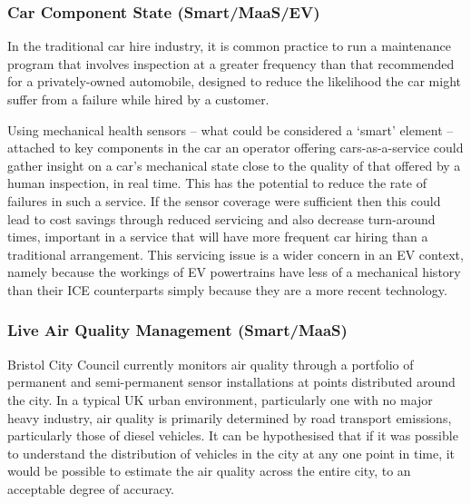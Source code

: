 \documentclass[b5paper,10pt]{article}
\begin{document}
\subsubsection{Car Component State (Smart/MaaS/EV)}

In the traditional car hire industry, it is common practice to run a
maintenance program that involves inspection at a greater frequency
than that recommended for a privately-owned automobile, designed to
reduce the likelihood the car might suffer from a failure while hired
by a customer.

Using mechanical health sensors -- what could be considered a `smart'
element -- attached to key components in the car an operator offering
cars-as-a-service could gather insight on a car's mechanical state
close to the quality of that offered by a human inspection, in real
time. This has the potential to reduce the rate of failures in such a
service. If the sensor coverage were sufficient then this could lead
to cost savings through reduced servicing and also decrease
turn-around times, important in a service that will have more frequent
car hiring than a traditional arrangement. This servicing issue is a
wider concern in an EV context, namely because the workings of EV
powertrains have less of a mechanical history than their ICE
counterparts simply because they are a more recent technology.


\subsubsection{Live Air Quality Management (Smart/MaaS)}

Bristol City Council currently monitors air quality through a
portfolio of permanent and semi-permanent sensor installations at
points distributed around the city. In a typical UK urban environment,
particularly one with no major heavy industry, air quality is
primarily determined by road transport emissions, particularly those
of diesel vehicles. It can be hypothesised that if it was possible to
understand the distribution of vehicles in the city at any one point
in time, it would be possible to estimate the air quality across the
entire city, to an acceptable degree of accuracy.
\end{document}
